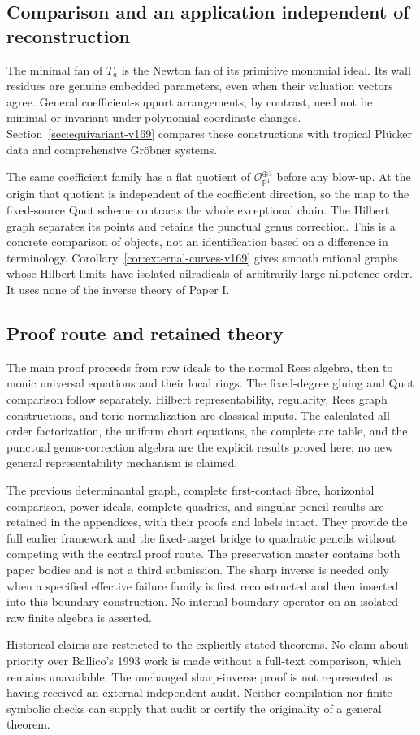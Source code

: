 \documentclass[11pt,reqno]{amsart}
\numberwithin{equation}{section}
\theoremstyle{definition}\newtheorem{definition}[theorem]{Definition}
\theoremstyle{remark}\newtheorem{remark}[theorem]{Remark}
\newcommand{\Pj}{\mathbb P}\newcommand{\A}{\mathbb A}
\newcommand{\OO}{\mathcal O}\newcommand{\II}{\mathcal I}
\begin{document}
\subsection{Comparison and an application independent of reconstruction}
The minimal fan of $T_a$ is the Newton fan of its primitive monomial
ideal. Its wall residues are genuine embedded parameters, even when
their valuation vectors agree. General coefficient-support
arrangements, by contrast, need not be minimal or invariant under
polynomial coordinate changes. Section~\ref{sec:equivariant-v169}
compares these constructions with tropical Pl\"ucker data and
comprehensive Gr\"obner systems.

The same coefficient family has a flat quotient of
$\OO_{\Pj^1}^{\oplus3}$ before any blow-up. At the origin that quotient
is independent of the coefficient direction, so the map to the
fixed-source Quot scheme contracts the whole exceptional chain.
The Hilbert graph separates its points and retains the punctual genus
correction. This is a concrete comparison of objects, not an
identification based on a difference in terminology.
Corollary~\ref{cor:external-curves-v169} gives smooth rational graphs
whose Hilbert limits have isolated nilradicals of arbitrarily large
nilpotence order. It uses none of the inverse theory of Paper I.

\subsection{Proof route and retained theory}
The main proof proceeds from row ideals to the normal Rees algebra,
then to monic universal equations and their local rings. The
fixed-degree gluing and Quot comparison follow separately. Hilbert
representability, regularity, Rees graph constructions, and toric
normalization are classical inputs. The calculated all-order
factorization, the uniform chart equations, the complete arc table,
and the punctual genus-correction algebra are the explicit results
proved here; no new general representability mechanism is claimed.

The previous determinantal graph, complete first-contact fibre,
horizontal comparison, power ideals, complete quadrics, and singular
pencil results are retained in the appendices, with their proofs and
labels intact. They provide the full earlier framework and the
fixed-target bridge to quadratic pencils without competing with the
central proof route. The preservation master contains both paper
bodies and is not a third submission. The sharp inverse is needed
only when a specified effective failure family is first reconstructed
and then inserted into this boundary construction. No internal
boundary operator on an isolated raw finite algebra is asserted.

Historical claims are restricted to the explicitly stated theorems.
No claim about priority over Ballico's 1993 work is made without a
full-text comparison, which remains unavailable. The unchanged
sharp-inverse proof is not represented as having received an external
independent audit. Neither compilation nor finite symbolic checks can
supply that audit or certify the originality of a general theorem.
\end{document}
